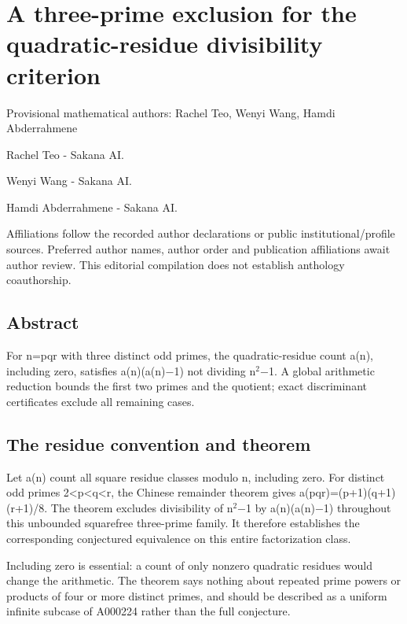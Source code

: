 \documentclass[11pt,a4paper]{article}
\begin{document}
\section{A three-prime exclusion for the quadratic-residue divisibility criterion}
{\small Provisional mathematical authors: Rachel Teo, Wenyi Wang, Hamdi Abderrahmene\par}\medskip
{\small Rachel Teo  -  Sakana AI.\par}

{\small Wenyi Wang  -  Sakana AI.\par}

{\small Hamdi Abderrahmene  -  Sakana AI.\par}

{\small Affiliations follow the recorded author declarations or public institutional/profile sources. Preferred author names, author order and publication affiliations await author review. This editorial compilation does not establish anthology coauthorship.\par}

\subsection{Abstract}
For n=pqr with three distinct odd primes, the quadratic-residue count a(n), including zero, satisfies a(n)(a(n)\ensuremath{-}1) not dividing n\ensuremath{^2}\ensuremath{-}1. A global arithmetic reduction bounds the first two primes and the quotient; exact discriminant certificates exclude all remaining cases.

\subsection{The residue convention and theorem}
Let a(n) count all square residue classes modulo n, including zero. For distinct odd primes 2<p<q<r, the Chinese remainder theorem gives a(pqr)=(p+1)(q+1)(r+1)/8. The theorem excludes divisibility of n\ensuremath{^2}\ensuremath{-}1 by a(n)(a(n)\ensuremath{-}1) throughout this unbounded squarefree three-prime family. It therefore establishes the corresponding conjectured equivalence on this entire factorization class.

Including zero is essential: a count of only nonzero quadratic residues would change the arithmetic. The theorem says nothing about repeated prime powers or products of four or more distinct primes, and should be described as a uniform infinite subcase of A000224 rather than the full conjecture.
\end{document}
